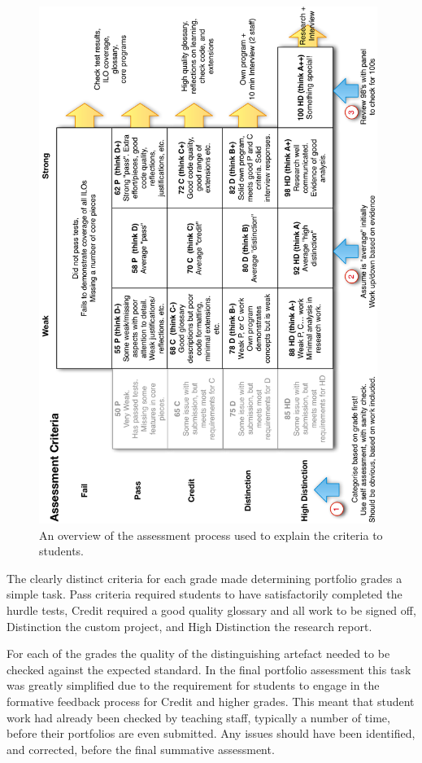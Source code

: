 \begin{figure}[htbp]
	\centering
	\includegraphics[width=0.98\textwidth]{AssessmentProcess}
	\caption{An overview of the assessment process used to explain the criteria to students.}
	\label{fig:assessment_process}
\end{figure}

The clearly distinct criteria for each grade made determining portfolio grades a simple task. Pass criteria required students to have satisfactorily completed the hurdle tests, Credit required a good quality glossary and all work to be signed off, Distinction the custom project, and High Distinction the research report. 

For each of the grades the quality of the distinguishing artefact needed to be checked against the expected standard. In the final portfolio assessment this task was greatly simplified due to the requirement for students to engage in the formative feedback process for Credit and higher grades. This meant that student work had already been checked by teaching staff, typically a number of time, before their portfolios are even submitted. Any issues should have been identified, and corrected, before the final summative assessment.

